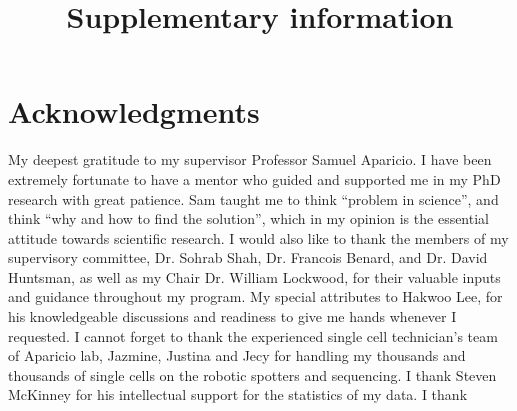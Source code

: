 

\makeatletter
\newcommand{\putFigLargCap}[5]
{
\begin{center}
\texttt{[image: \#1]}   
\bigskip
\setbox0\vbox{
\let\caption@rule\relax
\captionof{figure}[#5]{\textbf{#5} #3 \label{#4}}
\global\skip1\lastskip\unskip
\global\setbox1\lastbox

}
\unvbox0
\setbox0\hbox{\unhbox1\unskip\unskip\unpenalty
\global\setbox1\lastbox}
\unvbox1
\vskip\skip1
\end{center}
}
\makeatother





\title{Supplementary information}















\chapter{Acknowledgments}

My deepest gratitude to my supervisor Professor Samuel Aparicio. I have been extremely
fortunate to have a mentor who guided and supported me in my PhD
research with great patience. Sam taught me to think “problem in science”,
 and think “why and how to find the solution”, which in my opinion is the essential attitude towards scientific research. I would also like to thank the members of my supervisory committee, Dr. Sohrab Shah, Dr. Francois Benard, and Dr. David Huntsman, as well as my Chair Dr. William Lockwood, for their valuable inputs and guidance throughout my program. My special attributes to Hakwoo Lee, for his knowledgeable discussions and  readiness to give me hands whenever I requested. I cannot forget to thank the experienced single cell technician's team of Aparicio lab, Jazmine, Justina and Jecy for handling my thousands and thousands of single cells on the robotic spotters and sequencing. I thank Steven McKinney for his intellectual support for the statistics of my data. I thank 

